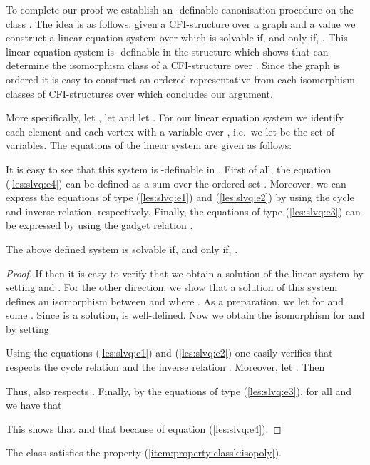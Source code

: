 \documentclass[a4paper,UKenglish]{lipics}
\theoremstyle{plain}
\newcommand{\eqcountreset}
{
\setcounter{equation}{0}
}
\begin{document}
To complete our proof we establish an -definable 
canonisation procedure on the class . 
The idea is as follows: given a CFI-structure  
over a graph  and a value  we construct a 
linear equation system over  which is solvable if, 
and only if, . This linear equation system 
is -definable in the structure  which shows that  can 
determine the isomorphism class of a CFI-structure over . Since the 
graph  is ordered it is easy to construct an ordered
representative from each isomorphism classes of CFI-structures over  
which concludes our argument.

More specifically, let , let  and let . 
For our linear equation system we identify each element  
and each vertex  with a variable over , i.e.\ we let 
 be the set of variables.
The equations of the linear system are given as follows:

\eqcountreset



It is easy to see that this system is -definable in . 
First of all, the equation (\ref{les:slvq:e4}) can be defined as a sum over the 
ordered set . Moreover, we can 
express the equations of type (\ref{les:slvq:e1}) and (\ref{les:slvq:e2}) by 
using the cycle and inverse relation, respectively. 
Finally, the equations of type (\ref{les:slvq:e3}) can be expressed by using 
the gadget relation . 


\begin{lemma}
 The above defined system is solvable if, and only if, 
 .
\end{lemma}
\begin{proof}
 If  then it is easy to verify that we obtain a solution 
 of the linear system by setting  and .
For the other direction, we show that a solution  of 
this system defines an isomorphism  between  and  where . 
As a preparation, we let  for  and some . Since  is a solution,  is well-defined.
Now we obtain the isomorphism  for  and  by setting

Using the equations (\ref{les:slvq:e1}) and (\ref{les:slvq:e2}) one 
easily verifies that  respects the cycle relation  and the inverse 
relation .
Moreover, let . Then 

Thus,  also respects .
Finally, by the equations of type (\ref{les:slvq:e3}),  for all  and 
 we have that

This shows that  and that  because of equation (\ref{les:slvq:e4}).
\end{proof}


\begin{lemma} \label{lemma:slv:classk:prop:3}
The class  satisfies the property
(\ref{item:property:classk:isopoly}).
\end{lemma}
\end{document}
